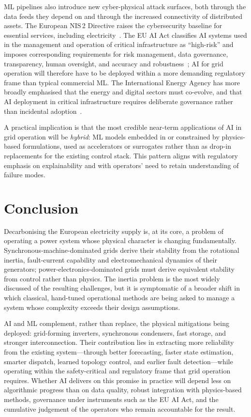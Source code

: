 \documentclass[conference]{IEEEtran}
\begin{document}
ML pipelines also introduce new cyber-physical attack surfaces, both through the data feeds they depend on and through the increased connectivity of distributed assets. The European NIS\,2 Directive raises the cybersecurity baseline for essential services, including electricity~\cite{eu2022nis2}. The EU AI Act classifies AI systems used in the management and operation of critical infrastructure as ``high-risk'' and imposes corresponding requirements for risk management, data governance, transparency, human oversight, and accuracy and robustness~\cite{eu2024aiact}; AI for grid operation will therefore have to be deployed within a more demanding regulatory frame than typical commercial ML. The International Energy Agency has more broadly emphasised that the energy and digital sectors must co-evolve, and that AI deployment in critical infrastructure requires deliberate governance rather than incidental adoption~\cite{iea2023ai}.

A practical implication is that the most credible near-term applications of AI in grid operation will be \emph{hybrid}: ML models embedded in or constrained by physics-based formulations, used as accelerators or surrogates rather than as drop-in replacements for the existing control stack. This pattern aligns with regulatory emphasis on explainability and with operators' need to retain understanding of failure modes.

\section{Conclusion}\label{sec:conclusion}
Decarbonising the European electricity supply is, at its core, a problem of operating a power system whose physical character is changing fundamentally. Synchronous-machine-dominated grids derive their stability from the rotational inertia, fault-current capability and electromechanical dynamics of their generators; power-electronics-dominated grids must derive equivalent stability from control rather than physics. The inertia problem is the most widely discussed of the resulting challenges, but it is symptomatic of a broader shift in which classical, hand-tuned operational methods are being asked to manage a system whose complexity exceeds their design assumptions.

AI and ML complement, rather than replace, the physical mitigations being deployed: grid-forming inverters, synchronous condensers, fast storage, and stronger interconnection. Their contribution lies in extracting more reliability from the existing system---through better forecasting, faster state estimation, smarter dispatch, learned topology control, and earlier fault detection---while operating within the safety-critical and regulatory frame that grid operation requires. Whether AI delivers on this promise in practice will depend less on algorithmic progress than on data quality, robust integration with physics-based methods, governance under instruments such as the EU AI Act, and the cumulative judgement of the operators who remain accountable for the result.



\end{document}
